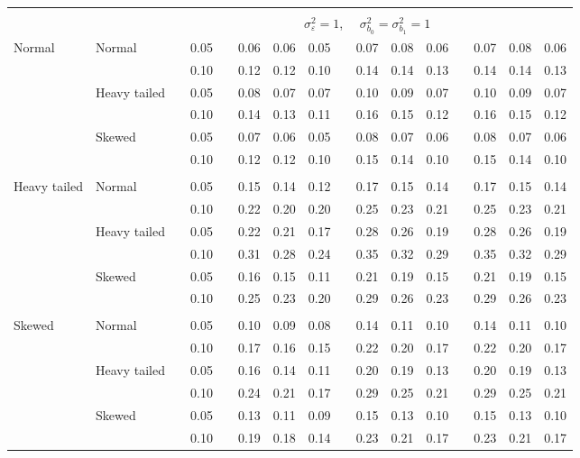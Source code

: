 \documentclass{article} %
\begin{document}
\begin{table}[ht]
\begin{scriptsize}
\begin{center}
\begin{tabular}{ll p{.1cm} c p{.1cm} rrr p{.1cm} rrr p{.1cm} rrr}
&&&&&&&&&&&&&&&\\
& && && \multicolumn{9}{c}{$\sigma_{\varepsilon}^2 = 1$, \ \ $\sigma_{b_0}^2 = \sigma_{b_1}^2 = 1$} \\ \cline{6-16}
\rowcolor{gray!20}Normal       & Normal       && 0.05 &&   0.06 & 0.06 & 0.05 && 0.07 & 0.08 & 0.06 && 0.07 & 0.08 & 0.06 \\ 
\rowcolor{gray!20}             &              && 0.10 &&   0.12 & 0.12 & 0.10 && 0.14 & 0.14 & 0.13 && 0.14 & 0.14 & 0.13 \\ 
\rowcolor{gray!20}             & Heavy tailed && 0.05 &&   0.08 & 0.07 & 0.07 && 0.10 & 0.09 & 0.07 && 0.10 & 0.09 & 0.07 \\ 
\rowcolor{gray!20}             &              && 0.10 &&   0.14 & 0.13 & 0.11 && 0.16 & 0.15 & 0.12 && 0.16 & 0.15 & 0.12 \\ 
\rowcolor{gray!20}             & Skewed       && 0.05 &&   0.07 & 0.06 & 0.05 && 0.08 & 0.07 & 0.06 && 0.08 & 0.07 & 0.06 \\ 
\rowcolor{gray!20}             &              && 0.10 &&   0.12 & 0.12 & 0.10 && 0.15 & 0.14 & 0.10 && 0.15 & 0.14 & 0.10 \\ 
             &&&&&&&&&&&&&&&\\
Heavy tailed & Normal       && 0.05 &&   0.15 & 0.14 & 0.12 && 0.17 & 0.15 & 0.14 && 0.17 & 0.15 & 0.14 \\ 
             &              && 0.10 &&   0.22 & 0.20 & 0.20 && 0.25 & 0.23 & 0.21 && 0.25 & 0.23 & 0.21 \\ 
             & Heavy tailed && 0.05 &&   0.22 & 0.21 & 0.17 && 0.28 & 0.26 & 0.19 && 0.28 & 0.26 & 0.19 \\ 
             &              && 0.10 &&   0.31 & 0.28 & 0.24 && 0.35 & 0.32 & 0.29 && 0.35 & 0.32 & 0.29 \\ 
             & Skewed       && 0.05 &&   0.16 & 0.15 & 0.11 && 0.21 & 0.19 & 0.15 && 0.21 & 0.19 & 0.15 \\ 
             &              && 0.10 &&   0.25 & 0.23 & 0.20 && 0.29 & 0.26 & 0.23 && 0.29 & 0.26 & 0.23 \\ 
             &&&&&&&&&&&&&&&\\
Skewed       & Normal       && 0.05 &&   0.10 & 0.09 & 0.08 && 0.14 & 0.11 & 0.10 && 0.14 & 0.11 & 0.10 \\ 
             &              && 0.10 &&   0.17 & 0.16 & 0.15 && 0.22 & 0.20 & 0.17 && 0.22 & 0.20 & 0.17 \\ 
             & Heavy tailed && 0.05 &&   0.16 & 0.14 & 0.11 && 0.20 & 0.19 & 0.13 && 0.20 & 0.19 & 0.13 \\ 
             &              && 0.10 &&   0.24 & 0.21 & 0.17 && 0.29 & 0.25 & 0.21 && 0.29 & 0.25 & 0.21 \\ 
             & Skewed       && 0.05 &&   0.13 & 0.11 & 0.09 && 0.15 & 0.13 & 0.10 && 0.15 & 0.13 & 0.10 \\ 
             &              && 0.10 &&   0.19 & 0.18 & 0.14 && 0.23 & 0.21 & 0.17 && 0.23 & 0.21 & 0.17 \\ 



\end{tabular}
\end{center}
\end{scriptsize}
\end{table}
\end{document}
